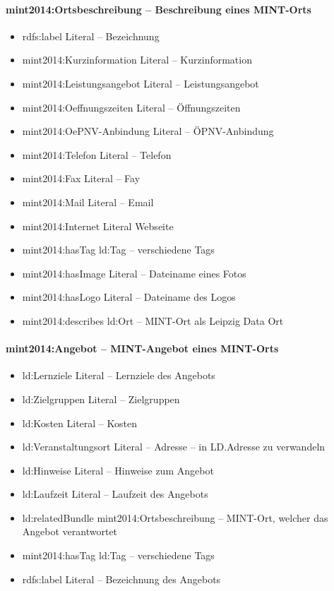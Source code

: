 \documentclass[a4paper,11pt]{article}
\begin{document}
\paragraph{mint2014:Ortsbeschreibung – Beschreibung eines MINT-Orts}
\begin{itemize}\itemsep0pt
\item rdfs:label Literal – Bezeichnung
\item  mint2014:Kurzinformation Literal – Kurzinformation
\item  mint2014:Leistungsangebot Literal – Leistungsangebot
\item  mint2014:Oeffnungszeiten Literal – Öffnungszeiten
\item  mint2014:OePNV-Anbindung Literal – ÖPNV-Anbindung
\item  mint2014:Telefon Literal – Telefon
\item  mint2014:Fax Literal – Fay
\item  mint2014:Mail Literal – Email
\item  mint2014:Internet Literal  Webseite
\item  mint2014:hasTag ld:Tag – verschiedene Tags
\item  mint2014:hasImage Literal – Dateiname eines Fotos
\item  mint2014:hasLogo Literal – Dateiname des Logos
\item  mint2014:describes ld:Ort – MINT-Ort als Leipzig Data Ort
\end{itemize}
\paragraph{mint2014:Angebot – MINT-Angebot eines MINT-Orts}
\begin{itemize}\itemsep0pt
\item ld:Lernziele Literal – Lernziele des Angebots
\item ld:Zielgruppen Literal – Zielgruppen
\item ld:Kosten Literal – Kosten
\item ld:Veranstaltungsort Literal – Adresse – in LD.Adresse zu verwandeln
\item ld:Hinweise Literal – Hinweise zum Angebot
\item ld:Laufzeit Literal – Laufzeit des Angebots
\item ld:relatedBundle mint2014:Ortsbeschreibung – MINT-Ort, welcher das
  Angebot verantwortet
\item mint2014:hasTag ld:Tag – verschiedene Tags
\item rdfs:label Literal – Bezeichnung des Angebots
\end{itemize}
\end{document}
